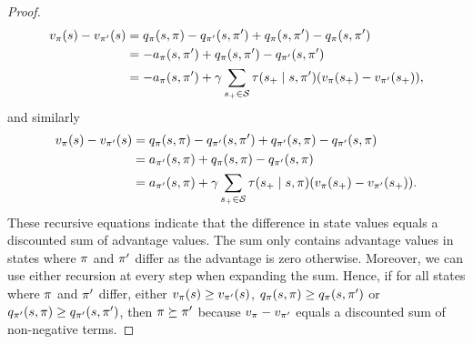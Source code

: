 \begin{proof}
\begin{align*}
    v_{\pi}(s) - v_{\pi'}(s) 
    &= q_{\pi}(s, \pi) - q_{\pi'}(s, \pi') + q_{\pi}(s, \pi') - q_{\pi}(s, \pi')
    \\
    &= -a_{\pi}(s, \pi') + q_{\pi}(s, \pi') - q_{\pi'}(s, \pi')
    \\
    &= -a_{\pi}(s, \pi') + \gamma \sum_{s_+ \in \mathcal{S}} \tau(s_+ \mid s, \pi') (v_{\pi}(s_+) - v_{\pi'}(s_+)) ,
\end{align*}
and similarly
\begin{align*}
    v_{\pi}(s) - v_{\pi'}(s) 
    &= q_{\pi}(s, \pi) - q_{\pi'}(s, \pi') + q_{\pi'}(s, \pi) - q_{\pi'}(s, \pi)
    \\
    &= a_{\pi'}(s, \pi) + q_{\pi}(s, \pi) - q_{\pi'}(s, \pi)
    \\
    &= a_{\pi'}(s, \pi) + \gamma \sum_{s_+ \in \mathcal{S}} \tau(s_+ \mid s, \pi) (v_{\pi}(s_+) - v_{\pi'}(s_+)) .
\end{align*}
These recursive equations indicate that the difference in state values equals a 
discounted sum of advantage values.
The sum only contains advantage values in states where $\pi$ and $\pi'$ differ as the advantage is zero otherwise.
Moreover, we can use either recursion at every step when expanding the sum.
Hence, 
if for all states where $\pi$ and $\pi'$ differ,
either $v_{\pi}(s) \geq v_{\pi'}(s)$, $q_{\pi}(s, \pi) \geq q_{\pi}(s, \pi')$ or $q_{\pi'}(s, \pi) \geq q_{\pi'}(s, \pi')$,
then $\pi \succeq \pi'$ because $v_{\pi} - v_{\pi'}$ equals a discounted sum of non-negative terms.
% 
% 
\end{proof}

